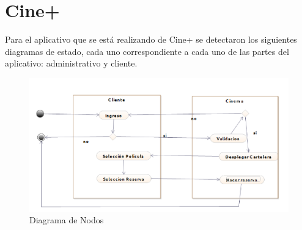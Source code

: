 \section{Cine+}
Para el aplicativo que se está realizando de Cine+ se detectaron los siguientes diagramas de estado, cada uno correspondiente a cada uno de las partes del aplicativo: administrativo y cliente.

\begin{figure}[h!]
	\centering
	\includegraphics[scale=0.5]{diseno/actividades/img/actividadesCliente}
	\caption{Diagrama de Nodos}
\end{figure}